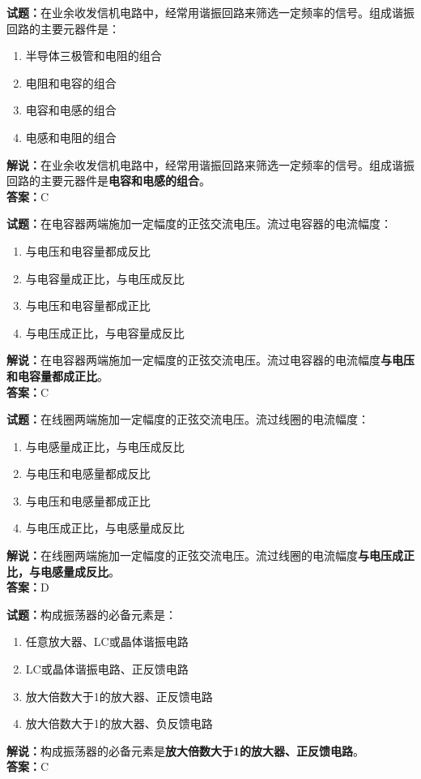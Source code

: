 \documentclass{ctexbook}
\begin{document}
\vspace{1em}

\textbf{试题：}在业余收发信机电路中，经常用谐振回路来筛选一定频率的信号。组成谐振回路的主要元器件是：
\begin{enumerate}[leftmargin=3em]
  \item 半导体三极管和电阻的组合
  \item 电阻和电容的组合
  \item 电容和电感的组合
  \item 电感和电阻的组合
\end{enumerate}
\noindent\textbf{解说：}在业余收发信机电路中，经常用谐振回路来筛选一定频率的信号。组成谐振回路的主要元器件是\textbf{电容和电感的组合}。\\\noindent\textbf{答案：}C

\vspace{1em}

\textbf{试题：}在电容器两端施加一定幅度的正弦交流电压。流过电容器的电流幅度：
\begin{enumerate}[leftmargin=3em]
  \item 与电压和电容量都成反比
  \item 与电容量成正比，与电压成反比
  \item 与电压和电容量都成正比
  \item 与电压成正比，与电容量成反比
\end{enumerate}
\noindent\textbf{解说：}在电容器两端施加一定幅度的正弦交流电压。流过电容器的电流幅度\textbf{与电压和电容量都成正比}。\\\noindent\textbf{答案：}C

\vspace{1em}

\textbf{试题：}在线圈两端施加一定幅度的正弦交流电压。流过线圈的电流幅度：
\begin{enumerate}[leftmargin=3em]
  \item 与电感量成正比，与电压成反比
  \item 与电压和电感量都成反比
  \item 与电压和电感量都成正比
  \item 与电压成正比，与电感量成反比
\end{enumerate}
\noindent\textbf{解说：}在线圈两端施加一定幅度的正弦交流电压。流过线圈的电流幅度\textbf{与电压成正比，与电感量成反比}。\\\noindent\textbf{答案：}D

\vspace{1em}

\textbf{试题：}构成振荡器的必备元素是：
\begin{enumerate}[leftmargin=3em]
  \item 任意放大器、LC或晶体谐振电路
  \item LC或晶体谐振电路、正反馈电路
  \item 放大倍数大于1的放大器、正反馈电路
  \item 放大倍数大于1的放大器、负反馈电路
\end{enumerate}
\noindent\textbf{解说：}构成振荡器的必备元素是\textbf{放大倍数大于1的放大器、正反馈电路}。\\\noindent\textbf{答案：}C
\end{document}
